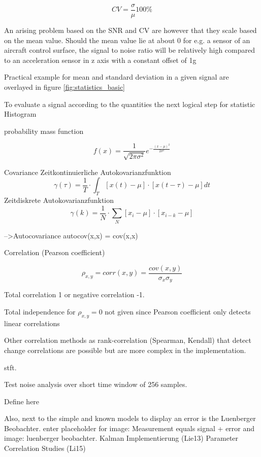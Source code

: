 \begin{equation}
    \label{eq:coeff_var}
    CV = \frac{\sigma}{\mu}100\%
\end{equation}

An arising problem based on the SNR and CV are however that they scale based on the mean value. Should the mean value lie at about 0 for e.g. a sensor of an aircraft control surface, the signal to noise ratio will be relatively high compared to an acceleration sensor in z axis with a constant offset of 1g

Practical example for mean and standard deviation in a given signal are overlayed in figure \ref{fig:statistics_basic}


To evaluate a signal according to the quantities the next logical step for statistic Histogram

probability mass function

\begin{equation}
    f(x)=\frac{1}{\sqrt{2 \pi \sigma^2}} e^{-\frac{(x-\mu)^2}{2 \sigma^2}}
\end{equation}


Covariance
Zeitkontinuierliche Autokovarianzfunktion
$$
\gamma(\tau)=\frac{1}{T} \cdot \int_T[x(t)-\mu] \cdot[x(t-\tau)-\mu] d t
$$
Zeitdiskrete Autokovarianzfunktion
$$
\gamma(k)=\frac{1}{N} \cdot \sum_N\left[x_i-\mu\right] \cdot\left[x_{i-k}-\mu\right]
$$

-->Autocovariance
autocov(x,x) = cov(x,x)


Correlation (Pearson coefficient)

$$\rho_{x,y} = corr(x,y)=\frac{cov(x,y)}{\sigma_x \sigma_y}$$

Total correlation 1 or negative correlation -1.

Total independence for $\rho_{x,y}=0$ not given since Pearson coefficient only detects linear correlations

Other correlation methods as rank-correlation (Spearman, Kendall) that detect change correlations are possible but are more complex in the implementation.


stft.

Test noise analysis over short time window of 256 samples.

Define here


Also, next to the simple and known models to display an error is the Luenberger Beobachter.
enter placeholder for image: Measurement equals signal + error
and image: luenberger beobachter. Kalman Implementierung (Lie13)
Parameter Correlation Studies (Li15)


